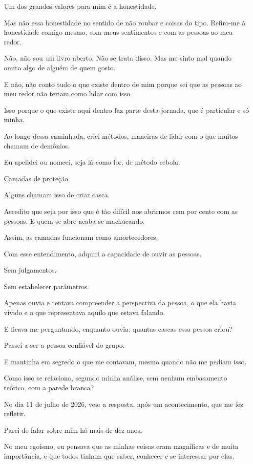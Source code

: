 \cleardoublepage
Um dos grandes valores para mim é a honestidade.

Mas não essa honestidade no sentido de não roubar e coisas do tipo. Refiro-me à honestidade comigo mesmo, com meus sentimentos e com as pessoas ao meu redor.

Não, não sou um livro aberto. Não se trata disso. Mas me sinto mal quando omito algo de alguém de quem gosto.

E não, não conto tudo o que existe dentro de mim porque sei que as pessoas ao meu redor não teriam como lidar com isso.

Isso porque o que existe aqui dentro faz parte desta jornada, que é particular e só minha.

Ao longo dessa caminhada, criei métodos, maneiras de lidar com o que muitos chamam de demônios.

Eu apelidei ou nomeei, seja lá como for, de método cebola.

Camadas de proteção.

Alguns chamam isso de criar casca.

Acredito que seja por isso que é tão difícil nos abrirmos cem por cento com as pessoas. E quem se abre acaba se machucando.

Assim, as camadas funcionam como amortecedores.

Com esse entendimento, adquiri a capacidade de ouvir as pessoas.

Sem julgamentos.

Sem estabelecer parâmetros.

Apenas ouvia e tentava compreender a perspectiva da pessoa, o que ela havia vivido e o que representava aquilo que estava falando.

E ficava me perguntando, enquanto ouvia: quantas cascas essa pessoa criou?

Passei a ser a pessoa confiável do grupo.

E mantinha em segredo o que me contavam, mesmo quando não me pediam isso.

Como isso se relaciona, segundo minha análise, sem nenhum embasamento teórico, com a parede branca?

No dia 11 de julho de 2026, veio a resposta, após um acontecimento, que me fez refletir.

Parei de falar sobre mim há mais de dez anos.

No meu egoísmo, eu pensava que as minhas coisas eram magníficas e de muita importância, e que todos tinham que saber, conhecer e se interessar por elas.

